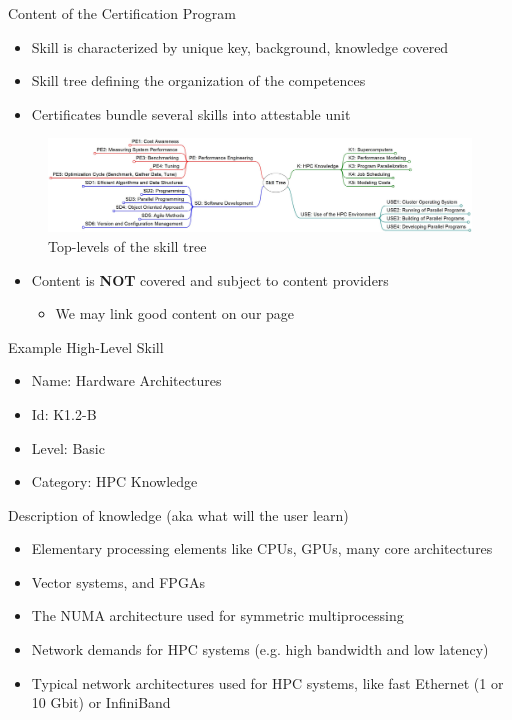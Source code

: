 \documentclass[compress,aspectratio=169]{beamer}
\begin{document}
\begin{frame}{Content of the Certification Program}
	\begin{itemize}
		\item Skill is characterized by unique key, background, knowledge covered
		\item Skill tree defining the organization of the competences
		\item Certificates bundle several skills into attestable unit
	\end{itemize}

		\begin{figure}
			\includegraphics[width=\textwidth]{skill-tree_top_levels}
			\caption{Top-levels of the skill tree}
		\end{figure}

	\begin{itemize}
		\item Content is \textbf{NOT} covered and subject to content providers
		\begin{itemize}
			\item We may link good content on our page
		\end{itemize}
	\end{itemize}
\end{frame}


\begin{frame}{Example High-Level Skill}

	\begin{itemize}
		\item Name: Hardware Architectures
		\item Id: K1.2-B
		\item Level: Basic
		\item Category: HPC Knowledge
	\end{itemize}

	\begin{block}{Description of knowledge (aka what will the user learn)}
		\begin{itemize}
			\item Elementary processing elements like CPUs, GPUs, many core architectures
			\item Vector systems, and FPGAs
			\item The NUMA architecture used for symmetric multiprocessing
			\item Network demands for HPC systems (e.g. high bandwidth and low latency)
			\item Typical network architectures used for HPC systems, like fast Ethernet (1 or 10 Gbit) or InfiniBand
		\end{itemize}
	\end{block}
\end{frame}
\end{document}
